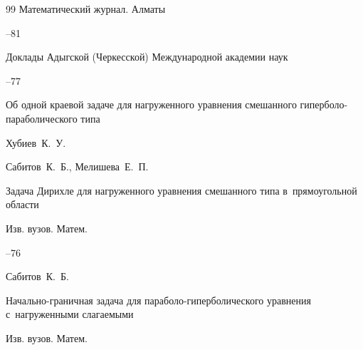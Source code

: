 \begin{thebibliography}{99}
\jour Математический журнал. Алматы



--81





\jour Доклады Адыгской (Черкесской) Международной академии наук




--77

\paper Об одной краевой задаче для нагруженного уравнения смешанного гиперболо-параболического типа

\by Хубиев~К.~У.









\by Сабитов~К.~Б., Мелишева~Е.~П.

\paper Задача Дирихле для нагруженного уравнения смешанного типа в~прямоугольной области

\jour Изв. вузов. Матем.



--76













\by Сабитов~К.~Б.

\paper Начально-граничная задача для параболо-гиперболического уравнения с~нагруженными слагаемыми

\jour Изв. вузов. Матем.


\end{thebibliography}
